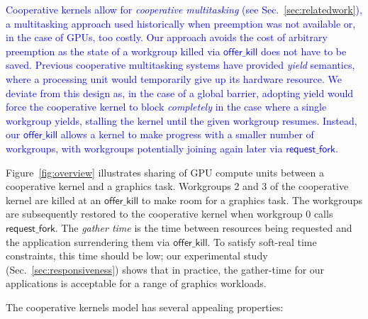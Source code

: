 \documentclass[sigconf]{acmart}
\newcommand{\TSAdded}[1]{\textcolor{blue}{#1}}
\newcommand{\myfiglong}{Figure~}
\newcommand{\mysec}{Sec.~}
\newcommand{\offerfork}{\mathsf{request\_fork}}
\newcommand{\offerkill}{\mathsf{offer\_kill}}
\begin{document}
\TSAdded{Cooperative kernels allow for \emph{cooperative multitasking}
  (see \mysec{\ref{sec:relatedwork}}), a multitasking approach used
  historically when preemption was not available or, in the case of
  GPUs, too costly. Our approach avoids the cost of arbitrary
  preemption as the state of a workgroup killed via $\offerkill$ does
  not have to be saved. Previous cooperative multitasking systems have
  provided \emph{yield} semantics, where a processing unit would
  temporarily give up its hardware resource. We deviate from this
  design as, in the case of a global barrier, adopting yield would
  force the cooperative kernel to block \emph{completely} in the case
  where a single workgroup yields, stalling the kernel until the given
  workgroup resumes.  Instead, our $\offerkill$ allows a kernel to
  make progress with a smaller number of workgroups, with workgroups
  potentially joining again later via $\offerfork$.}



\myfiglong{\ref{fig:overview}} illustrates sharing of GPU compute units between a cooperative kernel and a
graphics task. Workgroups 2 and 3 of the cooperative kernel
are killed at an $\offerkill$ to make room for a graphics
task. The workgroups are subsequently restored to the cooperative kernel when workgroup 0 calls $\offerfork$. The \emph{gather time} is the time
between resources being requested and the application surrendering them via $\offerkill$. To satisfy soft-real time
constraints, this time should be low; our experimental study
(\mysec{\ref{sec:responsiveness}}) shows that in practice, the
gather-time for our applications is acceptable for a range of graphics
workloads.

The cooperative kernels model has several appealing
properties:
\end{document}
